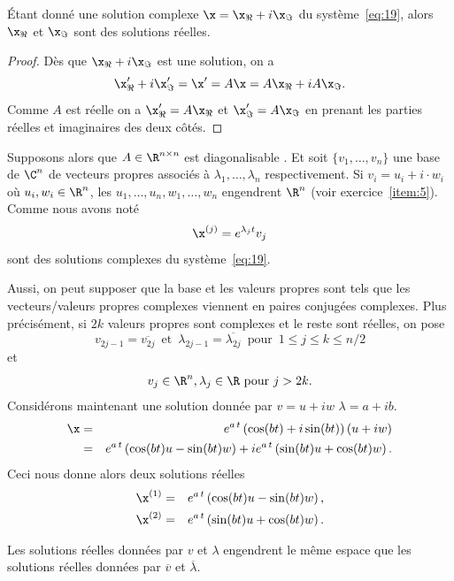 {\begin{lemma}
  \label{lem:14}
  Étant donné une solution complexe $\x = \x_\Re + i \x_\Im$ du système~\eqref{eq:19}, alors $\x_\Re$ et $\x_\Im$ sont des solutions réelles.  
\end{lemma}
\begin{proof}
  Dès que $\x_\Re + i \x_\Im $ est une solution, on a 
  \begin{displaymath}
   \x'_\Re+ i \x'_\Im = \x' = A \x = A\x_\Re + i A\x_\Im. 
  \end{displaymath}
Comme $A $ est réelle on a $\x_\Re' = A\x_\Re$ et $\x'_\Im = A \x_\Im$ en prenant les parties réelles et imaginaires des deux côtés. 
\end{proof}


Supposons alors que $A \in \R^{n \times n}$ est diagonalisable . Et soit $\{v_1,\dots,v_n\}$ une base de $\C^n$ de vecteurs propres associés à 
$\lambda_1,\dots,\lambda_n$ respectivement. Si $v_i = u_i + i \cdot w_i$  où $u_i,w_i \in \R^n$, les $u_1,\dots,u_n,w_1,\dots,w_n$ engendrent $\R^n$ (voir exercice~\ref{item:5}). Comme nous avons noté 
\begin{displaymath}
  \x^{(j)} = e^{\lambda_j t} v_j
\end{displaymath}
sont des solutions complexes du système~\eqref{eq:19}.   

Aussi, on peut supposer que la base et les valeurs propres sont tels que les vecteurs/valeurs propres complexes viennent en paires conjugées complexes. Plus précisément, si $2k$ valeurs propres sont complexes et le reste sont réelles, on pose
\begin{equation}
\label{eq:22}
  v_{2j-1} = \overline{v_{2j}}\, \text{ et } \, \lambda_{2j-1} = \overline{\lambda_{2j}} \, \text{ pour } \, 1 \leq j \leq k \leq n/2 
\end{equation}
et 
\begin{equation}
  \label{eq:23}  
  v_j \in \R^n, \lambda_j \in \R \text{ pour } j > 2k. 
\end{equation}
%
Considérons maintenant une solution donnée par $v = u+iw$  $\lambda= a+ib$. 
\begin{eqnarray*}
  \x & = & e^{a \, t} \left(\cos (b t)  + i \sin (b t ) \right)  (u + i w)  \\
   & = & e^{a \, t} \left(\cos (b t) u - \sin (bt)w \right)  + ie^{a \, t} \left(\sin (b t ) u + \cos(bt)w \right). 
\end{eqnarray*}
Ceci nous donne alors deux solutions réelles 
\begin{eqnarray*}
  \x^{(1)} & = & e^{a \, t} \left(\cos (b t) u - \sin (bt)w \right), \\
  \x^{(2)} & = &  e^{a \, t} \left(\sin (b t ) u + \cos(bt)w \right). 
\end{eqnarray*}
\begin{remark}
  \label{rem:2}
  Les solutions réelles données par $v$ et $\lambda$ engendrent le même espace que les solutions réelles données par $\overline{v}$ et $\overline{\lambda}$. 
\end{remark}

}
